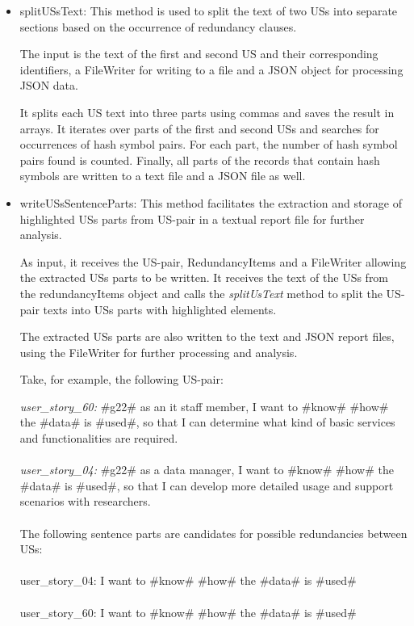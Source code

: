 \begin{itemize}
	
	\item splitUSsText: This method is used to split the text of two USs into separate sections based on the occurrence of redundancy clauses. 
	
	The input is the text of the first and second US and their corresponding identifiers, a FileWriter for writing to a file and a JSON object for processing JSON data. 
	
	It splits each US text into three parts using commas and saves the result in arrays. It iterates over parts of the first and second USs and searches for occurrences of hash symbol pairs. For each part, the number of hash symbol pairs found is counted. Finally, all parts of the records that contain hash symbols are written to a text file and a JSON file as well.
	
	\item writeUSsSentenceParts: This method facilitates the extraction and storage of highlighted USs parts from US-pair in a textual report file for further analysis.
	
	As input, it receives the US-pair, RedundancyItems and a FileWriter allowing the extracted USs parts to be written. It receives the text of the USs from the redundancyItems object and calls the \textit{splitUsText} method to split the US-pair texts into USs parts with highlighted elements.
	
	The extracted USs parts are also written to the text and JSON report files, using the FileWriter for further processing and analysis.
	
	\begin{example}
		Take, for example, the following US-pair:
		
		\textit{user\_story\_60:} \#g22\# as an it staff member, I want to \#know\# \#how\# the \#data\# is \#used\#, so that I can determine what kind of basic services and functionalities are required.\\\\
		\textit{user\_story\_04:} \#g22\# as a data manager, I want to \#know\# \#how\# the \#data\# is \#used\#, so that I can develop more detailed usage and support scenarios with researchers.\\\\
		The following sentence parts are candidates for possible redundancies between USs:\\\\
		user\_story\_04:  I want to \#know\# \#how\# the \#data\# is \#used\#\\\\
		user\_story\_60:  I want to \#know\# \#how\# the \#data\# is \#used\#	
	\end{example}
\end{itemize}
